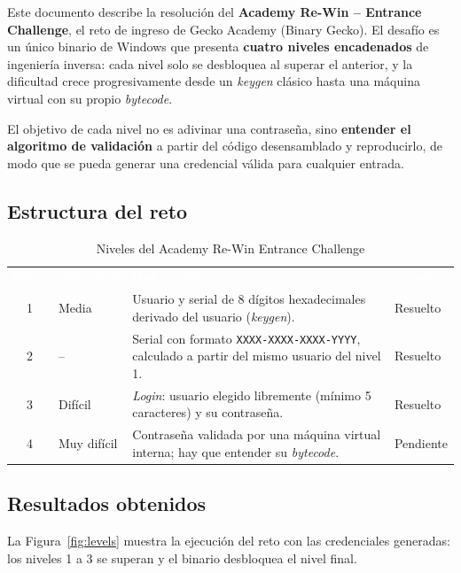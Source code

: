 Este documento describe la resolución del \textbf{Academy Re-Win -- Entrance Challenge}, el reto de ingreso de Gecko Academy (Binary Gecko). El desafío es un único binario de Windows que presenta \textbf{cuatro niveles encadenados} de ingeniería inversa: cada nivel solo se desbloquea al superar el anterior, y la dificultad crece progresivamente desde un \emph{keygen} clásico hasta una máquina virtual con su propio \emph{bytecode}.

El objetivo de cada nivel no es adivinar una contraseña, sino \textbf{entender el algoritmo de validación} a partir del código desensamblado y reproducirlo, de modo que se pueda generar una credencial válida para cualquier entrada.

\subsection{Estructura del reto}

\begin{table}[H]
\centering
{}
\begin{tabularx}{\linewidth}{c l X l}
\rowcolor{TableHeaderBgRowColor}
\textcolor{white}{\textbf{Nivel}} & \textcolor{white}{\textbf{Dificultad}} & \textcolor{white}{\textbf{Qué se pide}} & \textcolor{white}{\textbf{Estado}} \\
1 & Media & Usuario y serial de 8 dígitos hexadecimales derivado del usuario (\emph{keygen}). & Resuelto \\
2 & -- & Serial con formato \texttt{XXXX-XXXX-XXXX-YYYY}, calculado a partir del mismo usuario del nivel 1. & Resuelto \\
3 & Difícil & \emph{Login}: usuario elegido libremente (mínimo 5 caracteres) y su contraseña. & Resuelto \\
4 & Muy difícil & Contraseña validada por una máquina virtual interna; hay que entender su \emph{bytecode}. & Pendiente \\
\end{tabularx}
\caption{Niveles del Academy Re-Win Entrance Challenge}
\end{table}

\subsection{Resultados obtenidos}

La Figura~\ref{fig:levels} muestra la ejecución del reto con las credenciales generadas: los niveles 1 a 3 se superan y el binario desbloquea el nivel final.

